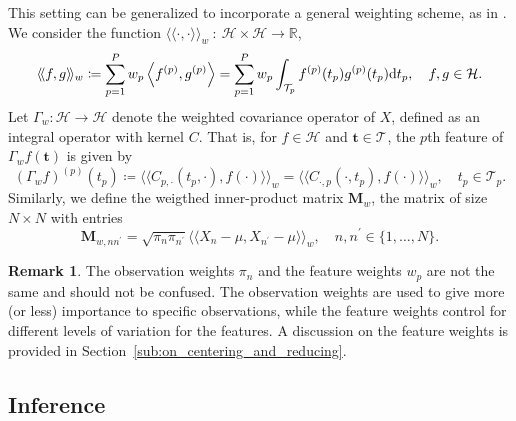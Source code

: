 \documentclass[times,sort&compress,3p]{elsarticle}
\theoremstyle{plain}%
\theoremstyle{definition}
\newtheorem{remark}{Remark}
\newcommand{\RR}{\mathbb{R}} %
\newcommand{\dd}{{\rm d}}
\newcommand{\TT}[1]{\mathcal{T}_{#1}} %
\newcommand{\HH}{\mathcal{H}} %
\newcommand{\pointt}{\mathbf{t}} %
\newcommand{\inLp}[2]{\left\langle#1, #2\right\rangle} %
\newcommand{\inH}[2]{\langle\!\langle#1, #2\rangle\!\rangle}
\newcommand{\fp}{f^{(p)}}
\newcommand{\gp}{g^{(p)}}
\begin{document}
This setting can be generalized to incorporate a general weighting scheme, as in \cite{chiouMultivariateFunctionalPrincipal2014,happMultivariateFunctionalPrincipal2018a}. We consider the function $\inH{\cdot}{\cdot}_w~:~\HH \times \HH \rightarrow \RR$,
\begin{equation}\label{eq:innerprodH_weight}
    \inH{f}{g}_w \coloneqq \sum_{p=1}^{P} w_p\inLp{\fp}{\gp} = \sum_{p=1}^{P}w_p\int_{\TT{p}} \fp(t_p)\gp(t_p) \dd t_p, \quad f, g \in \HH.
\end{equation}
Let $\Gamma_w : \HH \rightarrow \HH$ denote the weighted covariance operator of $X$, defined as an integral operator with kernel $C$. That is, for $f \in \HH$ and $\pointt \in \TT{}$, the $p$th feature of $\Gamma_w f(\pointt)$ is given by
\begin{equation}\label{eq:covariance_operator_components_weight}
    (\Gamma_w f)^{(p)}(t_p) \coloneqq \inH{C_{p, \cdot}(t_p, \cdot)}{f(\cdot)}_w = \inH{C_{\cdot, p}(\cdot, t_p)}{f(\cdot)}_w, \quad t_p \in \TT{p}.
\end{equation}
Similarly, we define the weigthed inner-product matrix $\mathbf{M}_w$, the matrix of size $N \times N$ with entries
\begin{equation}\label{eq:gram_mat_weights}
    \mathbf{M}_{w, nn^\prime} = \sqrt{\pi_n \pi_{n^{\prime}}}\inH{X_n - \mu}{X_{n^\prime} - \mu}_w, \quad n, n^\prime \in \{1, \dots, N\}.
\end{equation}
\begin{remark}
The observation weights $\pi_n$ and the feature weights $w_p$ are not the same and should not be confused. The observation weights are used to give more (or less) importance to specific observations, while the feature weights control for different levels of variation for the features. A discussion on the feature weights is provided in Section~\ref{sub:on_centering_and_reducing}.    
\end{remark}


\subsection{Inference} %
\label{sub:inference}
\end{document}

